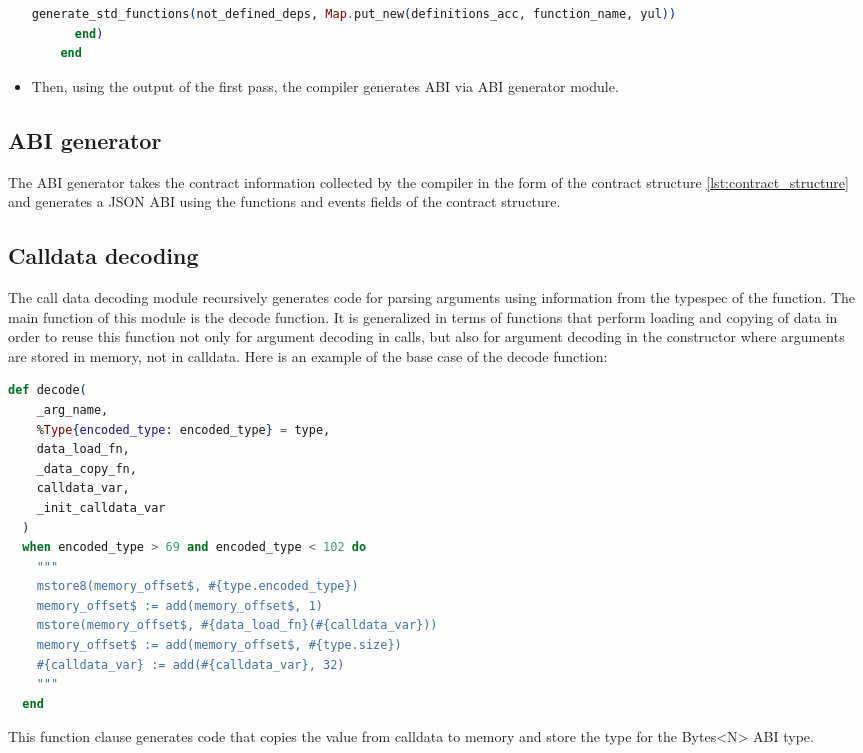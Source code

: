 \begin{itemize}
\begin{lstlisting}[caption={Standard function dependencies}, language=elixir, label={lst:standard_function_dependencies}]
        generate_std_functions(not_defined_deps, Map.put_new(definitions_acc, function_name, yul))
      end)
    end
    \end{lstlisting}
      
    
    \item Then, using the output of the first pass, the compiler generates ABI via ABI generator module.

\end{itemize}

\subsection{ABI generator}
\label{ssec:abi_generator}
The ABI generator takes the contract information collected by the compiler in the form of the contract structure \ref{lst:contract_structure} and generates a JSON ABI using the functions and events fields of the contract structure.


\subsection{Calldata decoding}
\label{ssec:calldata_decoding}
The call data decoding module recursively generates code for parsing arguments using information from the typespec of the function. The main function of this module is the decode function. It is generalized in terms of functions that perform loading and copying of data in order to reuse this function not only for argument decoding in calls, but also for argument decoding in the constructor where arguments are stored in memory, not in calldata. Here is an example of the base case of the decode function:

\begin{lstlisting}[caption={Calldata decoding base case}, language=elixir, label={lst:calldata_decoding_base}]
  def decode(
    _arg_name,
    %Type{encoded_type: encoded_type} = type,
    data_load_fn,
    _data_copy_fn,
    calldata_var,
    _init_calldata_var
  )
  when encoded_type > 69 and encoded_type < 102 do
    """
    mstore8(memory_offset$, #{type.encoded_type})
    memory_offset$ := add(memory_offset$, 1)
    mstore(memory_offset$, #{data_load_fn}(#{calldata_var}))
    memory_offset$ := add(memory_offset$, #{type.size})
    #{calldata_var} := add(#{calldata_var}, 32)
    """
  end
\end{lstlisting}

This function clause generates code that copies the value from calldata to memory and store the type for the Bytes<N> ABI type.

